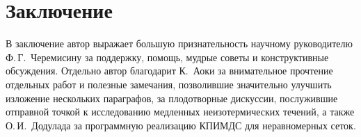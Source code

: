 \chapter*{Заключение}						%




В заключение автор выражает большую признательность научному руководителю
Ф.\,Г.~Черемисину за поддержку, помощь, мудрые советы и конструктивные обсуждения.
Отдельно автор благодарит К.~Аоки за внимательное прочтение отдельных работ и полезные замечания,
позволившие значительно улучшить изложение нескольких параграфов,
 за плодотворные дискуссии, послужившие отправной точкой
к исследованию медленных неизотермических течений,
а также О.\,И.~Додулада за программную реализацию КПИМДС для неравномерных сеток.

